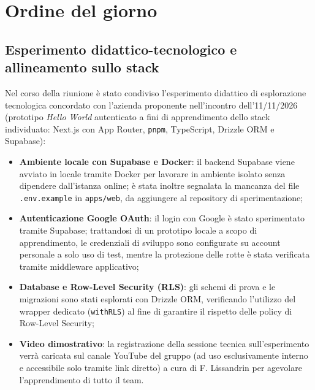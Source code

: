 \newpage
\vspace{0.8cm}

\section{Ordine del giorno}

\subsection{Esperimento didattico-tecnologico e allineamento sullo stack}
Nel corso della riunione è stato condiviso l'esperimento didattico di esplorazione tecnologica concordato con l'azienda proponente nell'incontro dell'11/11/2026 (prototipo \emph{Hello World} autenticato a fini di apprendimento dello stack individuato: Next.js con App Router, \texttt{pnpm}, TypeScript, Drizzle ORM e Supabase):
\begin{itemize}
    \item \textbf{Ambiente locale con Supabase e Docker}: il backend Supabase viene avviato in locale tramite Docker per lavorare in ambiente isolato senza dipendere dall'istanza online; è stata inoltre segnalata la mancanza del file \texttt{.env.example} in \texttt{apps/web}, da aggiungere al repository di sperimentazione;
    \item \textbf{Autenticazione Google OAuth}: il login con Google è stato sperimentato tramite Supabase; trattandosi di un prototipo locale a scopo di apprendimento, le credenziali di sviluppo sono configurate su account personale a solo uso di test, mentre la protezione delle rotte è stata verificata tramite middleware applicativo;
    \item \textbf{Database e Row-Level Security (RLS)}: gli schemi di prova e le migrazioni sono stati esplorati con Drizzle ORM, verificando l'utilizzo del wrapper dedicato (\texttt{withRLS}) al fine di garantire il rispetto delle policy di Row-Level Security;
    \item \textbf{Video dimostrativo}: la registrazione della sessione tecnica sull'esperimento verrà caricata sul canale YouTube del gruppo (ad uso esclusivamente interno e accessibile solo tramite link diretto) a cura di F. Lissandrin per agevolare l'apprendimento di tutto il team.
\end{itemize}

